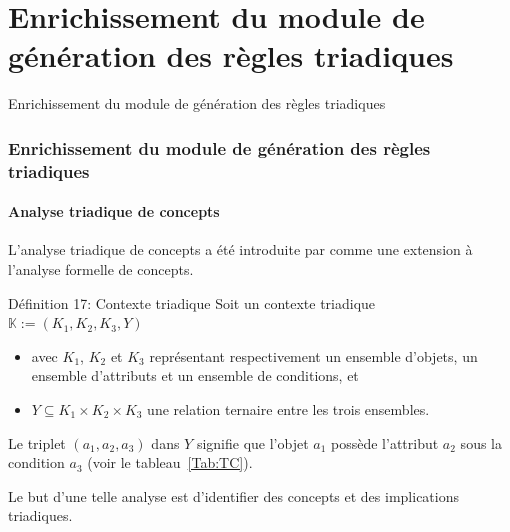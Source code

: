 \documentclass[french]{beamer}
\def\KK{\mathbb{K}}
\begin{document}
\section[Triadique]{Enrichissement du module de génération des règles triadiques}
\begin{frame}
\large{\centerline{Enrichissement du module de génération des règles triadiques}}
\end{frame}
\begin{frame}
\frametitle{Enrichissement du module de génération des règles triadiques}
\framesubtitle{Analyse triadique de concepts}
L'analyse triadique de concepts a été introduite par \parencite{Lehmann1995} comme une extension à l'analyse formelle de concepts.
\begin{block}{Définition 17: Contexte triadique}
Soit un contexte triadique $\KK:=(K_1, K_2, K_3, Y)$ 
\begin{itemize}
\item avec $K_1$, $K_2$ et $K_3$ représentant respectivement un ensemble d'objets, un ensemble d'attributs et un ensemble de conditions, et
\item $Y\subseteq K_1{\times}K_2{\times}K_3$ une relation ternaire entre les trois ensembles.
\end{itemize}
Le triplet $(a_1, a_2, a_3)$ dans $Y$ signifie que l'objet $a_1$ possède l'attribut $a_2$ sous la condition $a_3$ (voir le tableau~\ref{Tab:TC}). 
\end{block}
Le but d'une telle analyse est d'identifier des concepts et des implications triadiques.
\end{frame}
\end{document}
